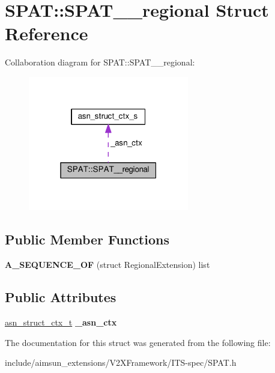 \hypertarget{structSPAT_1_1SPAT____regional}{}\section{S\+P\+AT\+:\+:S\+P\+A\+T\+\_\+\+\_\+regional Struct Reference}
\label{structSPAT_1_1SPAT____regional}


Collaboration diagram for S\+P\+AT\+:\+:S\+P\+A\+T\+\_\+\+\_\+regional\+:\nopagebreak
\begin{figure}[H]
\begin{center}
\leavevmode
\includegraphics[width=199pt]{structSPAT_1_1SPAT____regional__coll__graph}
\end{center}
\end{figure}
\subsection*{Public Member Functions}
\begin{DoxyCompactItemize}
\item 
{\bfseries A\+\_\+\+S\+E\+Q\+U\+E\+N\+C\+E\+\_\+\+OF} (struct Regional\+Extension) list\hypertarget{structSPAT_1_1SPAT____regional_a6cc39a357d48c34044bc8e12915f3a00}{}\label{structSPAT_1_1SPAT____regional_a6cc39a357d48c34044bc8e12915f3a00}

\end{DoxyCompactItemize}
\subsection*{Public Attributes}
\begin{DoxyCompactItemize}
\item 
\hyperlink{structasn__struct__ctx__s}{asn\+\_\+struct\+\_\+ctx\+\_\+t} {\bfseries \+\_\+asn\+\_\+ctx}\hypertarget{structSPAT_1_1SPAT____regional_ada9a0534e931b53e2d054c2bce64279c}{}\label{structSPAT_1_1SPAT____regional_ada9a0534e931b53e2d054c2bce64279c}

\end{DoxyCompactItemize}


The documentation for this struct was generated from the following file\+:\begin{DoxyCompactItemize}
\item 
include/aimsun\+\_\+extensions/\+V2\+X\+Framework/\+I\+T\+S-\/spec/S\+P\+A\+T.\+h\end{DoxyCompactItemize}
